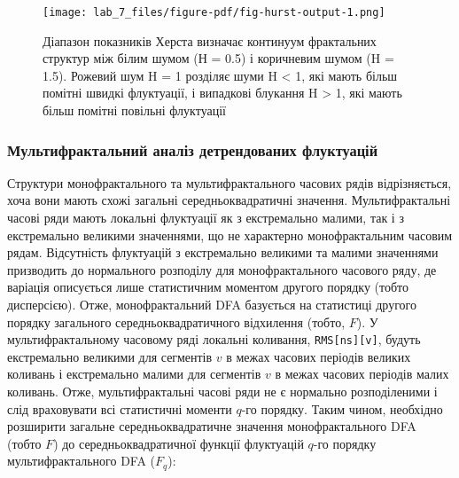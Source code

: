 \documentclass[
  letterpaper,
]{report}
\begin{document}
\begin{figure}[H]

{\centering \texttt{[image: lab\_7\_files/figure-pdf/fig-hurst-output-1.png]}

}

\caption{\label{fig-hurst}Діапазон показників Херста визначає континуум
фрактальних структур між білим шумом (Н = 0.5) і коричневим шумом (H =
1.5). Рожевий шум H = 1 розділяє шуми H \textless{} 1, які мають більш
помітні швидкі флуктуації, і випадкові блукання H \textgreater{} 1, які
мають більш помітні повільні флуктуації}

\end{figure}

\hypertarget{ux43cux443ux43bux44cux442ux438ux444ux440ux430ux43aux442ux430ux43bux44cux43dux438ux439-ux430ux43dux430ux43bux456ux437-ux434ux435ux442ux440ux435ux43dux434ux43eux432ux430ux43dux438ux445-ux444ux43bux443ux43aux442ux443ux430ux446ux456ux439-1}{%
\subsubsection{Мультифрактальний аналіз детрендованих
флуктуацій}\label{ux43cux443ux43bux44cux442ux438ux444ux440ux430ux43aux442ux430ux43bux44cux43dux438ux439-ux430ux43dux430ux43bux456ux437-ux434ux435ux442ux440ux435ux43dux434ux43eux432ux430ux43dux438ux445-ux444ux43bux443ux43aux442ux443ux430ux446ux456ux439-1}}

Структури монофрактального та мультифрактального часових рядів
відрізняється, хоча вони мають схожі загальні середньоквадратичні
значення. Мультифрактальні часові ряди мають локальні флуктуації як з
екстремально малими, так і з екстремально великими значеннями, що не
характерно монофрактальним часовим рядам. Відсутність флуктуацій з
екстремально великими та малими значеннями призводить до нормального
розподілу для монофрактального часового ряду, де варіація описується
лише статистичним моментом другого порядку (тобто дисперсією). Отже,
монофрактальний DFA базується на статистиці другого порядку загального
середньоквадратичного відхилення (тобто, \(F\)). У мультифрактальному
часовому ряді локальні коливання, \texttt{RMS{[}ns{]}{[}v{]}}, будуть
екстремально великими для сегментів \(v\) в межах часових періодів
великих коливань і екстремально малими для сегментів \(v\) в межах
часових періодів малих коливань. Отже, мультифрактальні часові ряди не є
нормально розподіленими і слід враховувати всі статистичні моменти
\(q\)-го порядку. Таким чином, необхідно розширити загальне
середньоквадратичне значення монофрактального DFA (тобто \(F\)) до
середньоквадратичної функції флуктуацій \(q\)-го порядку
мультифрактального DFA (\(F_{q}\)):
\end{document}
